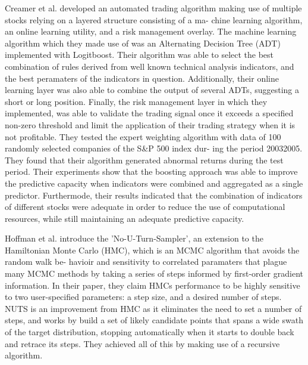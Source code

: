 \documentclass[times]{jtitauth}
\begin{document}
Creamer et al. developed an automated trading algorithm making use of multiple stocks relying on a layered structure consisting of a ma- chine learning algorithm, an online learning utility, and a risk management overlay. The machine learning algorithm which they made use of was an Alternating Decision Tree (ADT) implemented with Logitboost. Their algorithm was able to select the best combination of rules derived from well known technical analysis indicators, and the best peramaters of the indicators in question. Additionally, their online learning layer was also able to combine the output of several ADTs, suggesting a short or long position. Finally, the risk management layer in which they implemented, was able to validate the trading signal once it exceeds a specified non-zero threshold and limit the application of their trading strategy when it is not profitable. They tested the expert weighting algorithm with data of 100 randomly selected companies of the S\&P 500 index dur- ing the period 20032005. They found that their algorithm generated abnormal returns during the test period. Their experiments show that the boosting approach was able to improve the predictive capacity when indicators were combined and aggregated as a single predictor. Furthermode, their results indicated that the combination of indicators of different stocks were adequate in order to reduce the use of computational resources, while still maintaining an adequate predictive capacity.

Hoffman et al. introduce the ’No-U-Turn-Sampler’, an extension to the Hamiltonian Monte Carlo (HMC), which is an MCMC algorithm that avoids the random walk be- havioir and sensitivity to correlated paramaters that plague many MCMC methods by taking a series of steps informed by first-order gradient information. In their paper, they claim HMCs performance to be highly sensitive to two user-specified parameters: a step size, and a desired number of steps. NUTS is an improvement from HMC as it eliminates the need to set a number of steps, and works by build a set of likely candidate points that spans a wide swath of the target distribution, stopping automatically when it starts to double back and retrace its steps. They achieved all of this by making use of a recursive algorithm.
\end{document}
